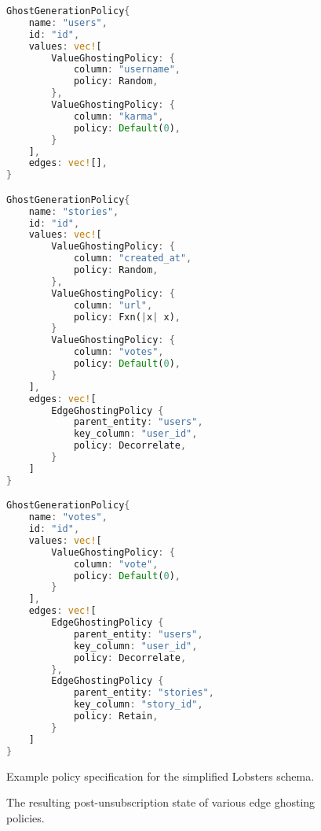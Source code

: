 \begin{figure}
\begin{lstlisting}[language=rust, numbers=none]
GhostGenerationPolicy{
    name: "users",
    id: "id",
    values: vec![
        ValueGhostingPolicy: {
            column: "username", 
            policy: Random,
        },
        ValueGhostingPolicy: {
            column: "karma", 
            policy: Default(0),
        }
    ],
    edges: vec![],
}

GhostGenerationPolicy{
    name: "stories",
    id: "id",
    values: vec![
        ValueGhostingPolicy: {
            column: "created_at", 
            policy: Random,
        },
        ValueGhostingPolicy: {
            column: "url", 
            policy: Fxn(|x| x),
        }
        ValueGhostingPolicy: {
            column: "votes", 
            policy: Default(0),
        }
    ],
    edges: vec![
        EdgeGhostingPolicy {
            parent_entity: "users",
            key_column: "user_id",
            policy: Decorrelate,
        }
    ]
}

GhostGenerationPolicy{
    name: "votes",
    id: "id",
    values: vec![
        ValueGhostingPolicy: {
            column: "vote", 
            policy: Default(0),
        }
    ],
    edges: vec![
        EdgeGhostingPolicy {
            parent_entity: "users",
            key_column: "user_id",
            policy: Decorrelate,
        },
        EdgeGhostingPolicy {
            parent_entity: "stories",
            key_column: "story_id",
            policy: Retain,
        }
    ]
}
\end{lstlisting}
    \caption{Example policy specification for the simplified Lobsters schema.}
\label{fig:example}
\end{figure}

\begin{figure}
\caption{The resulting post-unsubscription state of various edge ghosting policies.}
\label{fig:edge_policies}
\end{figure}


